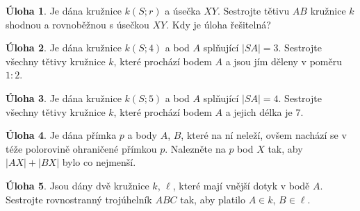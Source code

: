 \documentclass[10pt,a5paper]{extarticle}
\theoremstyle{definition}
\newtheorem{uloha}{Úloha}
\begin{document}
\begin{uloha}
Je dána kružnice $k(S;r)$ a úsečka $XY$. Sestrojte tětivu $AB$ kružnice $k$ shodnou a rovnoběžnou s úsečkou $XY$. Kdy je úloha řešitelná? %
\end{uloha}

\begin{uloha}
Je dána kružnice $k(S; 4)$ a bod $A$ splňující $|SA| = 3$. Sestrojte všechny tětivy kružnice $k$, které prochází bodem $A$ a jsou jím děleny v poměru $1:2$. %
\end{uloha}

\begin{uloha}
Je dána kružnice $k(S; 5)$ a bod $A$ splňující $|SA| = 4$. Sestrojte všechny tětivy kružnice $k$, které prochází bodem $A$ a jejich délka je $7$. %
\end{uloha}

\begin{uloha}
Je dána přímka $p$ a body $A$, $B$, které na ní neleží, ovšem nachází se v téže polorovině ohraničené přímkou $p$. Nalezněte na $p$ bod $X$ tak, aby $|AX| + |BX|$ bylo co nejmenší. %
\end{uloha}

\begin{uloha}
Jsou dány dvě kružnice $k$, $\ell$, které mají vnější dotyk v bodě $A$. Sestrojte rovnostranný trojúhelník $ABC$ tak, aby platilo $A \in k$, $B \in \ell$.
\end{uloha}
\end{document}
